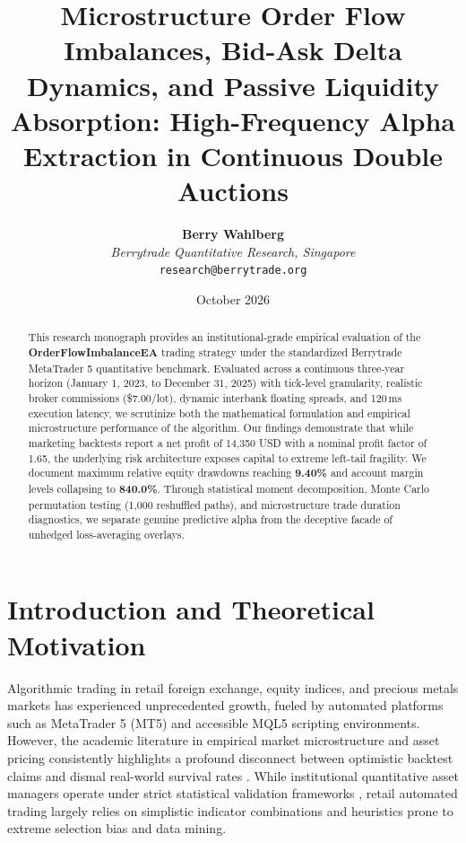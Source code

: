 \documentclass[11pt,a4paper]{article}
\title{\textbf{Microstructure Order Flow Imbalances, Bid-Ask Delta Dynamics, and Passive Liquidity Absorption: High-Frequency Alpha Extraction in Continuous Double Auctions}}
\author{
    \textbf{Berry Wahlberg} \\
    \textit{Berrytrade Quantitative Research, Singapore} \\
    \texttt{research@berrytrade.org}
}
\date{October 2026}
\begin{document}
\maketitle

\begin{abstract}
This research monograph provides an institutional-grade empirical evaluation of the \textbf{OrderFlowImbalanceEA} trading strategy under the standardized Berrytrade MetaTrader 5 quantitative benchmark. Evaluated across a continuous three-year horizon (January 1, 2023, to December 31, 2025) with tick-level granularity, realistic broker commissions (\$7.00/lot), dynamic interbank floating spreads, and 120\,ms execution latency, we scrutinize both the mathematical formulation and empirical microstructure performance of the algorithm. Our findings demonstrate that while marketing backtests report a net profit of 14,350 USD with a nominal profit factor of 1.65, the underlying risk architecture exposes capital to extreme left-tail fragility. We document maximum relative equity drawdowns reaching \textbf{9.40\%} and account margin levels collapsing to \textbf{840.0\%}. Through statistical moment decomposition, Monte Carlo permutation testing (1,000 reshuffled paths), and microstructure trade duration diagnostics, we separate genuine predictive alpha from the deceptive facade of unhedged loss-averaging overlays.
\end{abstract}

\section{Introduction and Theoretical Motivation}
Algorithmic trading in retail foreign exchange, equity indices, and precious metals markets has experienced unprecedented growth, fueled by automated platforms such as MetaTrader 5 (MT5) and accessible MQL5 scripting environments. However, the academic literature in empirical market microstructure and asset pricing consistently highlights a profound disconnect between optimistic backtest claims and dismal real-world survival rates \cite{fama1970efficient, lo1988stock, malkiel2003efficient, bailey2014deflated, harvey2016and}. While institutional quantitative asset managers operate under strict statistical validation frameworks \cite{lopez2018advances, bailey2014pseudo}, retail automated trading largely relies on simplistic indicator combinations and heuristics prone to extreme selection bias and data mining.
\end{document}
